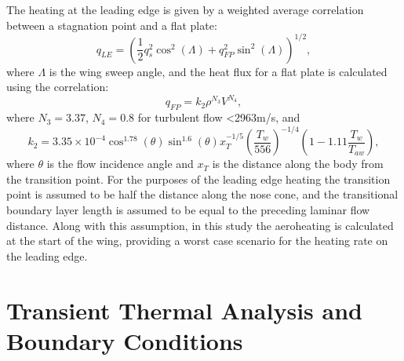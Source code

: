 The heating at the leading edge is given by a weighted average correlation between a stagnation point and a flat plate\cite{Dirkx,Tauber2008}:
\begin{equation}
q_{LE} = (\frac{1}{2}q_s^2 \cos^2(\Lambda) + q_{FP}^2 \sin^2(\Lambda))^{1/2},
\end{equation}
where $\Lambda$ is the wing sweep angle, and the heat flux for a flat plate is calculated using the correlation:
\begin{equation}
q_{FP} = k_2\rho^{N_3}V^{N_4},
\end{equation}
where $N_3 = 3.37$, $N_4 = 0.8$ for turbulent flow <2963m/s\cite{Dirkx,Tauber2008}, and
\begin{equation}
k_2 = 3.35 \times 10^{-4} \cos^{1.78}(\theta) \sin^{1.6}(\theta) x_T^{-1/5} (\frac{T_w}{556})^{-1/4} (1 - 1.11\frac{T_w}{T_{aw}}),
\end{equation}
where $\theta$ is the flow incidence angle and $x_T$ is the distance along the body from the transition point\cite{Dirkx,Tauber2008}. For the purposes of the leading edge heating the transition point is assumed to be half the distance along the nose cone, and the transitional boundary layer length is assumed to be equal to the preceding laminar flow distance. Along with this assumption, in this study the aeroheating is calculated at the start of the wing, providing a worst case scenario for the heating rate on the leading edge. 




\section{Transient Thermal Analysis and Boundary Conditions}



